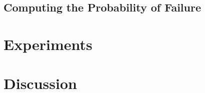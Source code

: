 


\subsection{Computing the Probability of Failure}






\section{Experiments}

\section{Discussion}